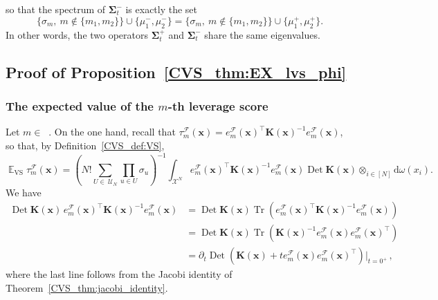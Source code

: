 \documentclass[twoside,11pt]{book}
\numberwithin{theorem}{chapter}
\numberwithin{definition}{chapter}
\numberwithin{proposition}{chapter}
\numberwithin{corollary}{chapter}
\numberwithin{example}{chapter}
\numberwithin{lemma}{chapter}
\numberwithin{assumption}{chapter}
\DeclareMathOperator{\Tr}{Tr}
\DeclareMathOperator{\Det}{Det}
\DeclareMathOperator{\VS}{\mathrm{VS}}
\DeclareMathOperator{\Tran}{\intercal}
\DeclareMathOperator{\EX}{\mathbb{E}}
\DeclareMathOperator{\F}{\mathcal{F}}
\DeclareMathOperator{\Ns}{\mathbb{N}^{*}}
\def\UN{\:\mathcal{U}_N}
\begin{document}
so that the spectrum of $\bm{\Sigma}_{t}^{-}$ is exactly the set
\begin{equation}
\{ \sigma_{m}, \: m \notin  \{m_{1},m_{2}\}\} \cup \{\mu_{1}^{-}, \mu_{2}^{-} \} = \{ \sigma_{m}, \: m \notin  \{m_{1},m_{2}\}\} \cup \{\mu_{1}^{+}, \mu_{2}^{+} \}.
\end{equation}
In other words, the two operators $\bm{\Sigma}_{t}^{+}$ and $\bm{\Sigma}_{t}^{-}$ share the same eigenvalues.


\subsection{Proof of Proposition~\ref{CVS_thm:EX_lvs_phi}}\label{CVS_app:proof_EX_lvs_phi}
\subsubsection{The expected value of the $m$-th leverage score \label{CVS_sec:proof_EX_VS_lvs_n_diff_phi}}
Let $m \in \Ns$. On the one hand, recall that $\tau_{m}^{\F}(\bm{x}) = e_{m}^{\mathcal{F}}(\bm{x})^{\Tran}\bm{K}(\bm{x})^{-1}e_{m}^{\mathcal{F}}(\bm{x})$, so that, by Definition~\ref{CVS_def:VS},
\begin{equation}
  \label{CVS_e:just_def_of_VS}
\EX_{\VS} \tau_{m}^{\F}(\bm{x}) = \left( N!\sum\limits_{U\in\UN}\prod\limits_{u \in U}\sigma_{u} \right)^{-1} \int_{\mathcal{X}^{N}} e_{m}^{\mathcal{F}}(\bm{x})^{\Tran}\bm{K}(\bm{x})^{-1}e_{m}^{\mathcal{F}}(\bm{x}) \Det \bm{K}(\bm{x}) \otimes_{i \in [N]} \mathrm{d}\omega(x_{i}).
\end{equation}
We have
\begin{align}
\Det \bm{K}(\bm{x})\,e_{m}^{\mathcal{F}}(\bm{x})^{\Tran}\bm{K}(\bm{x})^{-1}e_{m}^{\mathcal{F}}(\bm{x}) & = \Det \bm{K}(\bm{x})\Tr \left( e_{m}^{\mathcal{F}}(\bm{x})^{\Tran}\bm{K}(\bm{x})^{-1}e_{m}^{\mathcal{F}}(\bm{x}) \right) \nonumber \\
& = \Det \bm{K}(\bm{x})\Tr \left(\bm{K}(\bm{x})^{-1}e_{m}^{\mathcal{F}}(\bm{x})e_{m}^{\mathcal{F}}(\bm{x})^{\Tran}\right)\nonumber\\
&= \partial_{t} \Det (\bm{K}(\bm{x})+t e_{m}^{\mathcal{F}}(\bm{x})e_{m}^{\mathcal{F}}(\bm{x})^{\Tran})|_{t = 0^{+}}\,,\label{CVS_e:derivative_inside_the_integral}
\end{align}
where the last line follows from the Jacobi identity of Theorem~\ref{CVS_thm:jacobi_identity}.
\end{document}
